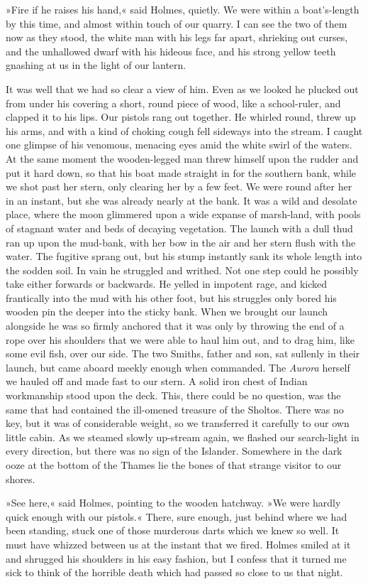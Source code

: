 »Fire if he raises his hand,« said Holmes, quietly. We were within a boat's-length by this time, and almost within touch of our quarry. I can see the two of them now as they stood, the white man with his legs far apart, shrieking out curses, and the unhallowed dwarf with his hideous face, and his strong yellow teeth gnashing at us in the light of our lantern.

It was well that we had so clear a view of him. Even as we looked he plucked out from under his covering a short, round piece of wood, like a school-ruler, and clapped it to his lips. Our pistols rang out together. He whirled round, threw up his arms, and with a kind of choking cough fell sideways into the stream. I caught one glimpse of his venomous, menacing eyes amid the white swirl of the waters. At the same moment the wooden-legged man threw himself upon the rudder and put it hard down, so that his boat made straight in for the southern bank, while we shot past her stern, only clearing her by a few feet. We were round after her in an instant, but she was already nearly at the bank. It was a wild and desolate place, where the moon glimmered upon a wide expanse of marsh-land, with pools of stagnant water and beds of decaying vegetation. The launch with a dull thud ran up upon the mud-bank, with her bow in the air and her stern flush with the water. The fugitive sprang out, but his stump instantly sank its whole length into the sodden soil. In vain he struggled and writhed. Not one step could he possibly take either forwards or backwards. He yelled in impotent rage, and kicked frantically into the mud with his other foot, but his struggles only bored his wooden pin the deeper into the sticky bank. When we brought our launch alongside he was so firmly anchored that it was only by throwing the end of a rope over his shoulders that we were able to haul him out, and to drag him, like some evil fish, over our side. The two Smiths, father and son, sat sullenly in their launch, but came aboard meekly enough when commanded. The \textit{Aurora} herself we hauled off and made fast to our stern. A solid iron chest of Indian workmanship stood upon the deck. This, there could be no question, was the same that had contained the ill-omened treasure of the Sholtos. There was no key, but it was of considerable weight, so we transferred it carefully to our own little cabin. As we steamed slowly up-stream again, we flashed our search-light in every direction, but there was no sign of the Islander. Somewhere in the dark ooze at the bottom of the Thames lie the bones of that strange visitor to our shores.

»See here,« said Holmes, pointing to the wooden hatchway. »We were hardly quick enough with our pistols.« There, sure enough, just behind where we had been standing, stuck one of those murderous darts which we knew so well. It must have whizzed between us at the instant that we fired. Holmes smiled at it and shrugged his shoulders in his easy fashion, but I confess that it turned me sick to think of the horrible death which had passed so close to us that night.